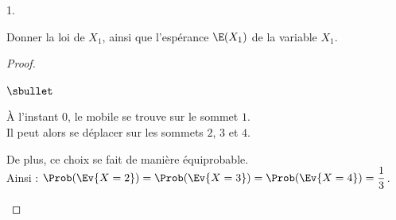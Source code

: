 \documentclass[11pt]{article}%
\begin{document}
\begin{noliste}{1.}
  \setlength{\itemsep}{4mm}
\item Donner la loi de $X_{1}$, ainsi que l'espérance $\E(X_{1})$ de
  la variable $X_{1}$.

  \begin{proof}~%
    \begin{noliste}{$\sbullet$} 
    \item À l'instant $0$, le mobile se trouve sur le sommet $1$.\\
      Il peut alors se déplacer sur les sommets $2$, $3$ et $4$.%

    \item De plus, ce choix se fait de manière équiprobable.\\ %
      Ainsi : $\Prob(\Ev{X = 2}) = \Prob(\Ev{X = 3}) = \Prob(\Ev{X =
        4}) = \dfrac{1}{3}$.%


\end{noliste}
\end{proof}
\end{noliste}
\end{document}
